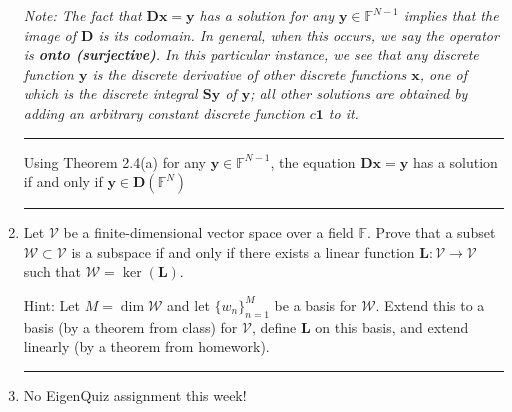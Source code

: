 \documentclass[12pt]{amsart}
\newcommand{\1}{\mathbbm{1}}
\newcounter{Theorem}
\numberwithin{equation}{section}
\numberwithin{Theorem}{section}
\theoremstyle{plain} %
\theoremstyle{definition}
\theoremstyle{remark}
\begin{document}
\begin{enumerate}[1.]
\textit{Note:
The fact that $\mathbf{D}\mathbf{x}=\mathbf{y}$ has a solution for any $\mathbf{y}\in\mathbb{F}^{N-1}$ implies that the image of $\mathbf{D}$ is its codomain.
In general, when this occurs, we say the operator is \textbf{onto (surjective)}.
In this particular instance, we see that any discrete function $\mathbf{y}$ is the discrete derivative of other discrete functions $\mathbf{x}$,
one of which is the discrete integral $\mathbf{S}\mathbf{y}$ of $\mathbf{y}$;
all other solutions are obtained by adding an arbitrary constant discrete function $c\mathbf{1}$ to it.}

\bigskip
\hrule
\bigskip

Using Theorem 2.4(a)
for any $\mathbf{y}\in\mathbb{F}^{N-1}$, the equation
$\mathbf{D}\mathbf{x}=\mathbf{y}$ has a solution
if and only if
$\mathbf{y}\in\mathbf{D}(\mathbb{F}^N)$



\bigskip
\hrule
\bigskip

\item Let \(\mathcal{V}\) be a finite-dimensional vector space over a field \(\mathbb{F}\). Prove that a subset \(\mathcal{W}\subset\mathcal{V}\) is a subspace if and only if there exists a linear function \(\mathbf{L}:\mathcal{V}\to\mathcal{V}\) such that \(\mathcal{W}=\operatorname{ker}(\mathbf{L})\). 

Hint: Let \(M = \operatorname{dim}\mathcal{W}\) and let \(\{w_{n}\}_{n=1}^{M}\) be a basis for \(\mathcal{W}\). Extend this to a basis (by a theorem from class) for \(\mathcal{V}\), define \(\mathbf{L}\) on this basis, and extend linearly (by a theorem from homework).


\bigskip
\hrule
\bigskip




\vspace*{\fill}
\item No EigenQuiz assignment this week!

\end{enumerate}
\end{document}
